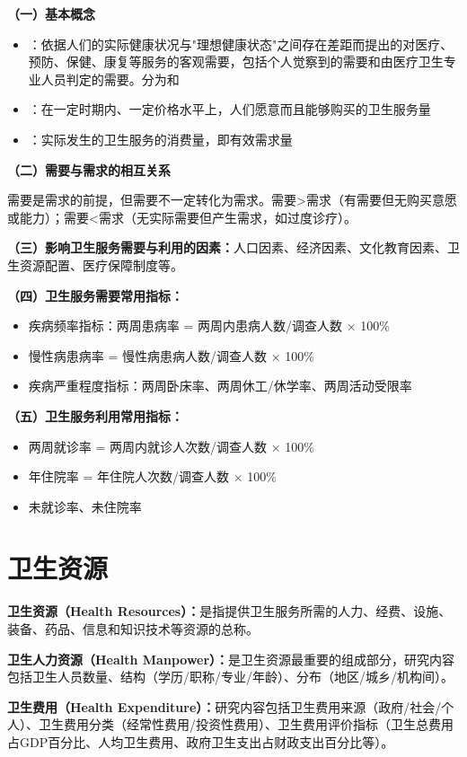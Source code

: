 \begin{keybox}
\textbf{（一）基本概念}

\begin{itemize}[leftmargin=*]
    \item {}：依据人们的实际健康状况与"理想健康状态"之间存在差距而提出的对医疗、预防、保健、康复等服务的客观需要，包括个人觉察到的需要和由医疗卫生专业人员判定的需要。分为和
    \item {}：在一定时期内、一定价格水平上，人们愿意而且能够购买的卫生服务量
    \item {}：实际发生的卫生服务的消费量，即有效需求量
\end{itemize}

\textbf{（二）需要与需求的相互关系}

需要是需求的前提，但需要不一定转化为需求。需要>需求（有需要但无购买意愿或能力）；需要<需求（无实际需要但产生需求，如过度诊疗）。

\textbf{（三）影响卫生服务需要与利用的因素：}人口因素、经济因素、文化教育因素、卫生资源配置、医疗保障制度等。

\textbf{（四）卫生服务需要常用指标：}
\begin{itemize}[leftmargin=*]
    \item 疾病频率指标：两周患病率 = 两周内患病人数/调查人数 × 100\%
    \item 慢性病患病率 = 慢性病患病人数/调查人数 × 100\%
    \item 疾病严重程度指标：两周卧床率、两周休工/休学率、两周活动受限率
\end{itemize}

\textbf{（五）卫生服务利用常用指标：}
\begin{itemize}[leftmargin=*]
    \item 两周就诊率 = 两周内就诊人次数/调查人数 × 100\%
    \item 年住院率 = 年住院人次数/调查人数 × 100\%
    \item 未就诊率、未住院率
\end{itemize}
\end{keybox}

\section{卫生资源}

\begin{defbox}
\textbf{卫生资源（Health Resources）：}是指提供卫生服务所需的人力、经费、设施、装备、药品、信息和知识技术等资源的总称。

\textbf{卫生人力资源（Health Manpower）：}是卫生资源最重要的组成部分，研究内容包括卫生人员数量、结构（学历/职称/专业/年龄）、分布（地区/城乡/机构间）。

\textbf{卫生费用（Health Expenditure）：}研究内容包括卫生费用来源（政府/社会/个人）、卫生费用分类（经常性费用/投资性费用）、卫生费用评价指标（卫生总费用占GDP百分比、人均卫生费用、政府卫生支出占财政支出百分比等）。
\end{defbox}

